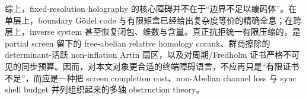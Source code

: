 

\noindent
综上，fixed-resolution holography 的核心障碍并不在于“边界不足以编码体”。在单层上，boundary Gödel code 与有限矩盒已经给出复杂度等价的精确全息；在跨层上，inverse system 甚至恢复闭包、维数与含量。真正抗拒统一有限压缩的，是 partial screen 留下的 free-abelian relative homology corank、群商擦除的 determinant-活跃 non-inflation Artin 扇区，以及对周期/Fredholm 证书严格不可见的同步预算。因而，对本文对象更合适的终端障碍语言，不应再只是“有限证书不足”，而应是一种把 screen completion cost、non-Abelian channel loss 与 sync shell budget 并列组织起来的多轴 obstruction theory。

\endinput
